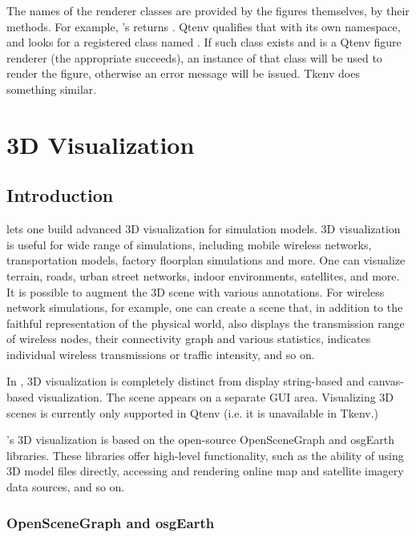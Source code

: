 The names of the renderer classes are provided by the figures themselves,
by their  methods. For example,
's  returns
. Qtenv qualifies that with its own namespace, and
looks for a registered class named
. If such class exists and is a
Qtenv figure renderer (the appropriate  succeeds), an
instance of that class will be used to render the figure, otherwise an
error message will be issued. Tkenv does something similar.


\section{3D Visualization}
\label{sec:graphics:osg}

\subsection{Introduction}
\label{sec:graphics:osg-introduction}

{\opp} lets one build advanced 3D visualization for simulation models.
3D visualization is useful for wide range of simulations, including
mobile wireless networks, transportation models, factory floorplan
simulations and more. One can visualize terrain, roads, urban street
networks, indoor environments, satellites, and more. It is possible to
augment the 3D scene with various annotations. For wireless network
simulations, for example, one can create a scene that, in addition to
the faithful representation of the physical world, also displays the
transmission range of wireless nodes, their connectivity graph
and various statistics, indicates individual wireless transmissions
or traffic intensity, and so on.

In {\opp}, 3D visualization is completely distinct from display
string-based and canvas-based visualization. The scene appears on a
separate GUI area. Visualizing 3D scenes is currently only supported
in Qtenv (i.e. it is unavailable in Tkenv.)

{\opp}'s 3D visualization is based on the open-source OpenSceneGraph
and osgEarth libraries. These libraries offer high-level functionality,
such as the ability of using 3D model files directly, accessing and
rendering online map and satellite imagery data sources, and so on.

\subsubsection{OpenSceneGraph and osgEarth}
\label{sec:graphics:osg-and-osgearth}

